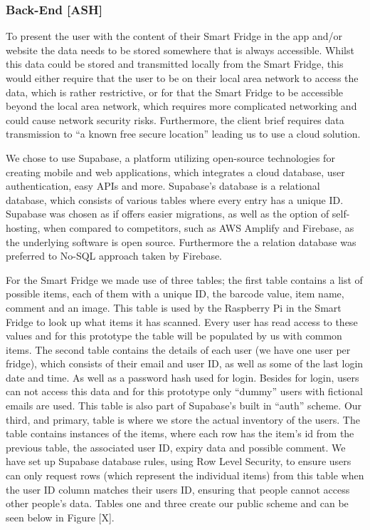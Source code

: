 


\subsubsection{Back-End [ASH]}

To present the user with the content of their Smart Fridge in the app and/or website the data needs to be stored somewhere that is always accessible.
Whilst this data could be stored and transmitted locally from the Smart Fridge, this would either require that the user to be on their local area network to access the data, which is rather restrictive, or for that the Smart Fridge to be accessible beyond the local area network, which requires more complicated networking and could cause network security risks.
Furthermore, the client brief requires data transmission to “a known free secure location” leading us to use a cloud solution.

We chose to use Supabase, a platform utilizing open-source technologies for creating mobile and web applications, which integrates a cloud database, user authentication, easy APIs and more.
Supabase's database is a relational database, which consists of various tables where every entry has a unique ID.
Supabase was chosen as if offers easier migrations, as well as the option of self-hosting, when compared to competitors, such as AWS Amplify and Firebase, as the underlying software is open source.
Furthermore the a relation database was preferred to No-SQL approach taken by Firebase.

For the Smart Fridge we made use of three tables; the first table contains a list of possible items, each of them with a unique ID, the barcode value, item name, comment and an image.
This table is used by the Raspberry Pi in the Smart Fridge to look up what items it has scanned.
Every user has read access to these values and for this prototype the table will be populated by us with common items.
The second table contains the details of each user (we have one user per fridge), which consists of their email and user ID, as well as some of the last login date and time.
As well as a password hash used for login.
Besides for login, users can not access this data and for this prototype only “dummy” users with fictional emails are used.
This table is also part of Supabase's built in “auth” scheme.
Our third, and primary, table is where we store the actual inventory of the users.
The table contains instances of the items, where each row has the item's id from the previous table, the associated user ID, expiry data and possible comment.
We have set up Supabase database rules, using Row Level Security, to ensure users can only request rows (which represent the individual items) from this table when the user ID column matches their users ID, ensuring that people cannot access other people's data.
Tables one and three create our public scheme and can be seen below in Figure [X].

